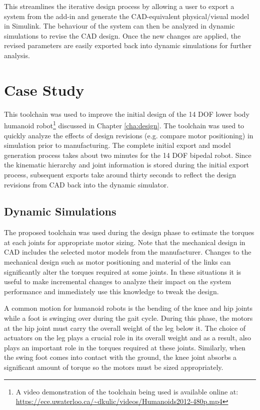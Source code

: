 This streamlines the iterative design process by allowing a user to export a system from the add-in and generate the CAD-equivalent physical/visual model in Simulink. The behaviour of the system can then be analyzed in dynamic simulations to revise the CAD design. Once the new changes are applied, the revised parameters are easily exported back into dynamic simulations for further analysis.


\section{Case Study} %
\label{sec:case_study}

This toolchain was used to improve the initial design of the 14 DOF lower body humanoid robot\footnote{A video demonstration of the toolchain being used is available online at: \\ \url{https://ece.uwaterloo.ca/~dkulic/videos/Humanoids2012-480p.mp4}} discussed in Chapter \ref{cha:design}. The toolchain was used to quickly analyze the effects of design revisions (e.g. compare motor positioning) in simulation prior to manufacturing. The complete initial export and model generation process takes about two minutes for the 14 DOF bipedal robot. Since the kinematic hierarchy and joint information is stored during the initial export process, subsequent exports take around thirty seconds to reflect the design revisions from CAD back into the dynamic simulator. 

\subsection{Dynamic Simulations} %
\label{sub:dynamic_simulations}

The proposed toolchain was used during the design phase to estimate the torques at each joints for appropriate motor sizing. Note that the mechanical design in CAD includes the selected motor models from the manufacturer. Changes to the mechanical design such as motor positioning and material of the links can significantly alter the torques required at some joints. In these situations it is useful to make incremental changes to analyze their impact on the system performance and immediately use this knowledge to tweak the design.

A common motion for humanoid robots is the bending of the knee and hip joints while a foot is swinging over during the gait cycle. During this phase, the motors at the hip joint must carry the overall weight of the leg below it. The choice of actuators on the leg plays a crucial role in its overall weight and as a result, also plays an important role in the torques required at these joints. Similarly, when the swing foot comes into contact with the ground, the knee joint absorbs a significant amount of torque so the motors must be sized appropriately.

